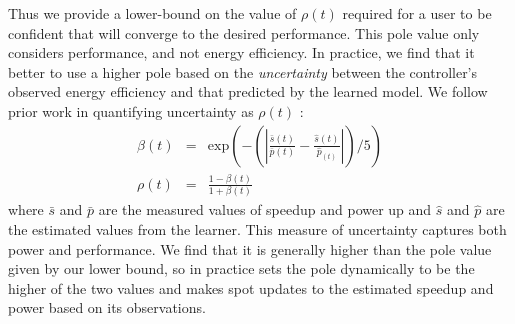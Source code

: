 Thus we provide a lower-bound on the value of $\rho(t)$ required for a
user to be confident that \SYSTEM{} will converge to the desired
performance.  This pole value only considers performance, and not
energy efficiency.  In practice, we find that it better to use a
higher pole based on the \emph{uncertainty} between the controller's
observed energy efficiency and that predicted by the learned model.
We follow prior work in quantifying uncertainty as $\rho(t) $
\cite{Tokic2010}:
\begin{equation}
  \begin{array}{rcl}
    \beta(t) &=&  \text{exp}{\left(- \left( \left|   \frac{\bar{s}(t)}{\bar{p}(t)}  -\frac{ \hat{s}(t)}{\hat{p}_(t)} \right| \right) /5\right)} \\
    \rho(t) &=& \frac{1-\beta(t)}{1+\beta(t)} 
  \end{array}
  \label{eqn:uncer}
\end{equation}
where $\bar{s}$ and $\bar{p}$ are the measured values of speedup and
power up and $\hat{s}$ and $\hat{p}$ are the estimated values from the
learner.  This measure of uncertainty captures both power and
performance.  We find that it is generally higher than the pole value
given by our lower bound, so in practice \SYSTEM{} sets the pole
dynamically to be the higher of the two values and \SYSTEM{} makes
spot updates to the estimated speedup and power based on its
observations.
